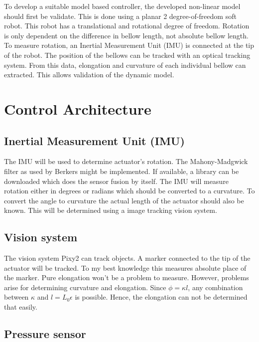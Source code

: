 To develop a suitable model based controller, the developed non-linear model should first be validate. This is done using a planar 2 degree-of-freedom soft robot. This robot has a translational and rotational degree of freedom. Rotation is only dependent on the difference in bellow length, not absolute bellow length. To measure rotation, an Inertial Measurement Unit (IMU) is connected at the tip of the robot. The position of the bellows can be tracked with an optical tracking system. From this data, elongation and curvature of each individual bellow can extracted. This allows validation of the dynamic model.


\section{Control Architecture}


\subsection{Inertial Measurement Unit (IMU)}

The IMU will be used to determine actuator's rotation. The Mahony-Madgwick filter as used by Berkers might be implemented. If available, a library can be downloaded which does the sensor fusion by itself. The IMU will measure rotation either in degrees or radians which should be converted to a curvature. To convert the angle to curvature the actual length of the actuator should also be known. This will be determined using a image tracking vision system.

\subsection{Vision system}

The vision system Pixy2 can track objects. A marker connected to the tip of the actuator will be tracked. To my best knowledge this measures absolute place of the marker. Pure elongation won't be a problem to measure. However, problems arise for determining curvature and elongation. Since $\phi = \kappa l$, any combination between $\kappa$ and $l = L_0\epsilon$ is possible. Hence, the elongation can not be determined that easily. 

\subsection{Pressure sensor}






